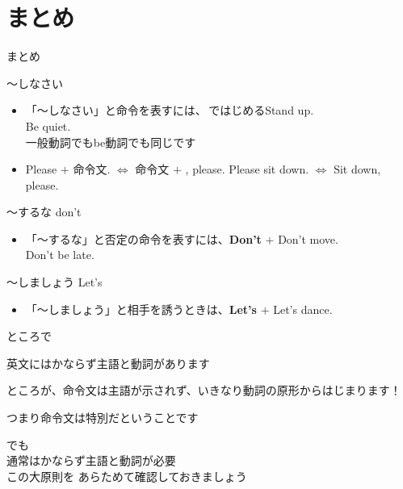 \documentclass[aspectratio=169,xcolor={dvipsnames,table}]{beamer}
\begin{document}
\section{まとめ}
\begin{frame}[plain]{まとめ}

 \begin{block}{～しなさい}

\begin{itemize}[square]\small
 \item 「～しなさい」と命令を表すには、\,ではじめる\hfill{\scriptsize Stand up.}\\
\hfill{\scriptsize Be quiet.}\\
\hfill{\scriptsize 一般動詞でもbe動詞でも同じです}
 \item Please $+$ 命令文. $\Longleftrightarrow$ 命令文 $+$ , please.%
\hfill{\scriptsize Please sit down. $\Longleftrightarrow$ Sit down, please.}\\
\end{itemize}
  \end{block}


\begin{block}{～するな don't }
\begin{itemize}[square]\small
 \item 「～するな」と否定の命令を表すには、\textbf{Don't} $+$ \hfill{\scriptsize Don't move.}\\
\hfill{\scriptsize Don't be late.}
 \end{itemize}
    \end{block}

\begin{block}{～しましょう Let's }
\begin{itemize}[square]\small
 \item 「～しましょう」と相手を誘うときは、\textbf{Let's} $+$ \hfill{\scriptsize Let's dance.}
 \end{itemize}
     \end{block}

\end{frame}
\begin{frame}[plain]{ところで}

\textdbend

 英文にはかならず主語と動詞があります\pause

ところが、命令文は主語が示されず、いきなり動詞の原形からはじまります！\pause

つまり命令文は特別だということです\pause

\bigskip

でも\\
通常はかならず主語と動詞が必要\\
この大原則を
あらためて確認しておきましょう
\end{frame}
\end{document}

